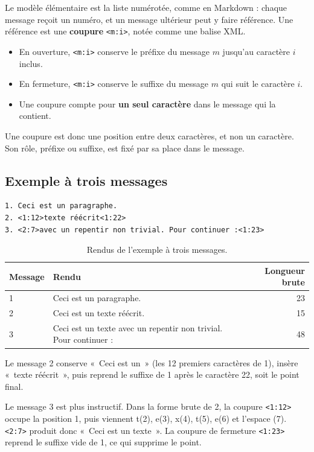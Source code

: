 \documentclass[11pt,a4paper]{article}
\newcommand{\cd}[1]{\texttt{#1}}
\begin{document}
Le modèle élémentaire est la liste numérotée, comme en Markdown : chaque message reçoit un numéro, et un message ultérieur peut y faire référence. Une référence est une \textbf{coupure} \cd{<m:i>}, notée comme une balise XML.
\begin{itemize}
  \item En ouverture, \cd{<m:i>} conserve le préfixe du message $m$ jusqu'au caractère $i$ inclus.
  \item En fermeture, \cd{<m:i>} conserve le suffixe du message $m$ qui suit le caractère $i$.
  \item Une coupure compte pour \textbf{un seul caractère} dans le message qui la contient.
\end{itemize}
Une coupure est donc une position entre deux caractères, et non un caractère. Son rôle, préfixe ou suffixe, est fixé par sa place dans le message.

\subsection{Exemple à trois messages}

\begin{Verbatim}
1. Ceci est un paragraphe.
2. <1:12>texte réécrit<1:22>
3. <2:7>avec un repentir non trivial. Pour continuer :<1:23>
\end{Verbatim}

\begin{table}[H]
\centering
\begin{tabularx}{\linewidth}{@{}lLr@{}}
\toprule
Message & Rendu & Longueur brute \\
 & Ceci est un paragraphe. & 23 \\
2 & Ceci est un texte réécrit. & 15 \\
3 & Ceci est un texte avec un repentir non trivial. Pour continuer : & 48 \\
\bottomrule
\end{tabularx}
\caption{Rendus de l'exemple à trois messages.}
\end{table}

Le message 2 conserve «~Ceci est un~» (les 12 premiers caractères de 1), insère «~texte réécrit~», puis reprend le suffixe de 1 après le caractère 22, soit le point final.

Le message 3 est plus instructif. Dans la forme brute de 2, la coupure \cd{<1:12>} occupe la position 1, puis viennent t(2), e(3), x(4), t(5), e(6) et l'espace (7). \cd{<2:7>} produit donc «~Ceci est un texte~». La coupure de fermeture \cd{<1:23>} reprend le suffixe vide de 1, ce qui supprime le point.
\end{document}
